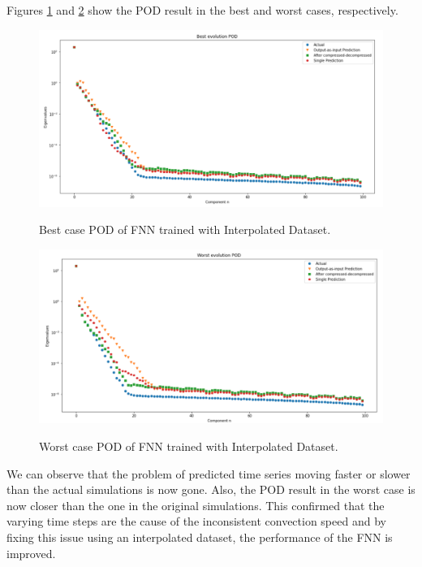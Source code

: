 Figures \ref{figure:FNN_interpolated_best_POD} and \ref{figure:FNN_interpolated_worst_POD} show the POD result in the best and worst cases, respectively.

\begin{figure}[H]
    \caption{Best case POD of FNN trained with Interpolated Dataset.}
    \includegraphics[scale=0.5]{figures/mantle_convection_images/larger_dataset_interpolated/FNN_Best_POD.png}
    \label{figure:FNN_interpolated_best_POD}
\end{figure}

\begin{figure}[H]
    \caption{Worst case POD of FNN trained with Interpolated Dataset.}
    \includegraphics[scale=0.5]{figures/mantle_convection_images/larger_dataset_interpolated/FNN_Worst_POD.png}
    \label{figure:FNN_interpolated_worst_POD}
\end{figure}

We can observe that the problem of predicted time series moving faster or slower than the actual simulations is now gone. Also, the POD result in the worst case is now closer than the one in the original simulations. This confirmed that the varying time steps are the cause of the inconsistent convection speed and by fixing this issue using an interpolated dataset, the performance of the FNN is improved.


